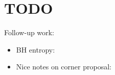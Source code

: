 \documentclass[11pt,letterpaper]{article}
\begin{document}
\section{TODO}
Follow-up work: \begin{itemize}
\item BH entropy: \cite{Iyer:1994ys, Jacobson:1993xs, Donnay:2016ejv}
\item Nice notes on corner proposal: \cite{Ciambelli:2022vot}
\end{itemize}



\end{document}
